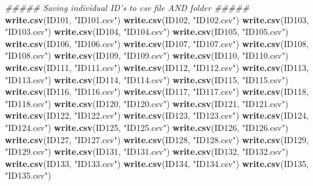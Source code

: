 \documentclass[
]{book}
\newenvironment{Shaded}{\begin{snugshade}}{\end{snugshade}}
\newcommand{\CommentTok}[1]{\textcolor[rgb]{0.56,0.35,0.01}{\textit{#1}}}
\newcommand{\KeywordTok}[1]{\textcolor[rgb]{0.13,0.29,0.53}{\textbf{#1}}}
\newcommand{\NormalTok}[1]{#1}
\newcommand{\StringTok}[1]{\textcolor[rgb]{0.31,0.60,0.02}{#1}}
\begin{document}
\begin{Shaded}
\begin{Highlighting}[]
{{{{{{\CommentTok{##### Saving individual ID's to csv file AND folder #####}
\KeywordTok{write.csv}\NormalTok{(ID101, }\StringTok{"ID101.csv"}\NormalTok{)}
\KeywordTok{write.csv}\NormalTok{(ID102, }\StringTok{"ID102.csv"}\NormalTok{)}
\KeywordTok{write.csv}\NormalTok{(ID103, }\StringTok{"ID103.csv"}\NormalTok{)}
\KeywordTok{write.csv}\NormalTok{(ID104, }\StringTok{"ID104.csv"}\NormalTok{)}
\KeywordTok{write.csv}\NormalTok{(ID105, }\StringTok{"ID105.csv"}\NormalTok{)}
\KeywordTok{write.csv}\NormalTok{(ID106, }\StringTok{"ID106.csv"}\NormalTok{)}
\KeywordTok{write.csv}\NormalTok{(ID107, }\StringTok{"ID107.csv"}\NormalTok{)}
\KeywordTok{write.csv}\NormalTok{(ID108, }\StringTok{"ID108.csv"}\NormalTok{)}
\KeywordTok{write.csv}\NormalTok{(ID109, }\StringTok{"ID109.csv"}\NormalTok{)}
\KeywordTok{write.csv}\NormalTok{(ID110, }\StringTok{"ID110.csv"}\NormalTok{)}
\KeywordTok{write.csv}\NormalTok{(ID111, }\StringTok{"ID111.csv"}\NormalTok{)}
\KeywordTok{write.csv}\NormalTok{(ID112, }\StringTok{"ID112.csv"}\NormalTok{)}
\KeywordTok{write.csv}\NormalTok{(ID113, }\StringTok{"ID113.csv"}\NormalTok{)}
\KeywordTok{write.csv}\NormalTok{(ID114, }\StringTok{"ID114.csv"}\NormalTok{)}
\KeywordTok{write.csv}\NormalTok{(ID115, }\StringTok{"ID115.csv"}\NormalTok{)}
\KeywordTok{write.csv}\NormalTok{(ID116, }\StringTok{"ID116.csv"}\NormalTok{)}
\KeywordTok{write.csv}\NormalTok{(ID117, }\StringTok{"ID117.csv"}\NormalTok{)}
\KeywordTok{write.csv}\NormalTok{(ID118, }\StringTok{"ID118.csv"}\NormalTok{)}
\KeywordTok{write.csv}\NormalTok{(ID120, }\StringTok{"ID120.csv"}\NormalTok{)}
\KeywordTok{write.csv}\NormalTok{(ID121, }\StringTok{"ID121.csv"}\NormalTok{)}
\KeywordTok{write.csv}\NormalTok{(ID122, }\StringTok{"ID122.csv"}\NormalTok{)}
\KeywordTok{write.csv}\NormalTok{(ID123, }\StringTok{"ID123.csv"}\NormalTok{)}
\KeywordTok{write.csv}\NormalTok{(ID124, }\StringTok{"ID124.csv"}\NormalTok{)}
\KeywordTok{write.csv}\NormalTok{(ID125, }\StringTok{"ID125.csv"}\NormalTok{)}
\KeywordTok{write.csv}\NormalTok{(ID126, }\StringTok{"ID126.csv"}\NormalTok{)}
\KeywordTok{write.csv}\NormalTok{(ID127, }\StringTok{"ID127.csv"}\NormalTok{)}
\KeywordTok{write.csv}\NormalTok{(ID128, }\StringTok{"ID128.csv"}\NormalTok{)}
\KeywordTok{write.csv}\NormalTok{(ID129, }\StringTok{"ID129.csv"}\NormalTok{)}
\KeywordTok{write.csv}\NormalTok{(ID131, }\StringTok{"ID131.csv"}\NormalTok{)}
\KeywordTok{write.csv}\NormalTok{(ID132, }\StringTok{"ID132.csv"}\NormalTok{)}
\KeywordTok{write.csv}\NormalTok{(ID133, }\StringTok{"ID133.csv"}\NormalTok{)}
\KeywordTok{write.csv}\NormalTok{(ID134, }\StringTok{"ID134.csv"}\NormalTok{)}
\KeywordTok{write.csv}\NormalTok{(ID135, }\StringTok{"ID135.csv"}\NormalTok{)}
}}}}}}
\end{Highlighting}
\end{Shaded}
\end{document}
